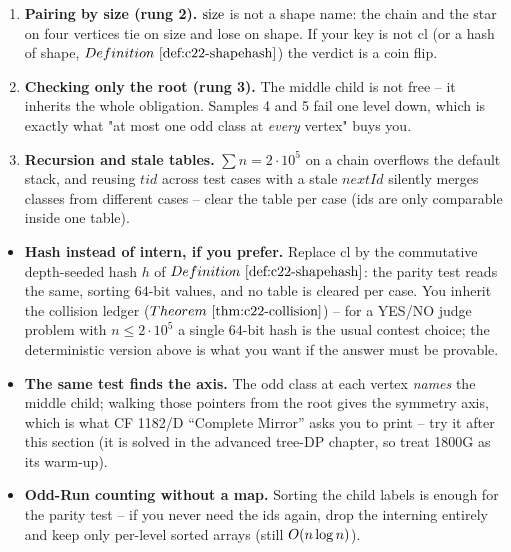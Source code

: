 \begin{warningbox}
\begin{enumerate}[nosep,leftmargin=1.6em]
  \item \textbf{Pairing by size (rung 2).} \(\operatorname{size}\) is not a shape name: the
        chain and the star on four vertices tie on size and lose on shape.  If
        your key is not \(\mathrm{cl}\) (or a hash of shape,
        \(\defref{c22-shapehash}\)) the verdict is a coin flip.
  \item \textbf{Checking only the root (rung 3).} The middle child is not free --
        it inherits the whole obligation.  Samples 4 and 5 fail one level down,
        which is exactly what "at most one odd class at \emph{every} vertex"
        buys you.
  \item \textbf{Recursion and stale tables.} \(\sum n=2\cdot10^{5}\) on a chain
        overflows the default stack, and reusing \(\mathit{tid}\) across test
        cases with a stale \(\mathit{nextId}\) silently merges classes from
        different cases -- clear the table per case (ids are only comparable
        inside one table).
\end{enumerate}
\end{warningbox}

\begin{hardeningbox}
\begin{itemize}[nosep,leftmargin=1.4em]
  \item \textbf{Hash instead of intern, if you prefer.} Replace \(\mathrm{cl}\) by
        the commutative depth-seeded hash \(h\) of \(\defref{c22-shapehash}\): the
        parity test reads the same, sorting \(64\)-bit values, and no table is
        cleared per case.  You inherit the collision ledger
        (\(\thmref{c22-collision}\)) -- for a YES/NO judge problem with
        \(n\le2\cdot10^{5}\) a single \(64\)-bit hash is the usual contest
        choice; the deterministic version above is what you want if the answer
        must be provable.
  \item \textbf{The same test finds the axis.} The odd class at each vertex
        \emph{names} the middle child; walking those pointers from the root gives
        the symmetry axis, which is what CF 1182/D ``Complete Mirror'' asks you to
        print -- try it after this section (it is solved in the advanced tree-DP
        chapter, so treat 1800G as its warm-up).
  \item \textbf{Odd-Run counting without a map.} Sorting the child labels is
        enough for the parity test -- if you never need the ids again, drop the
        interning entirely and keep only per-level sorted arrays (still
        \(O(n\log n)\)).
\end{itemize}
\end{hardeningbox}

